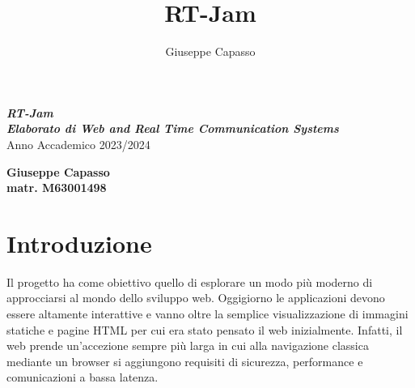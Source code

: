 \documentclass{article}
\title{RT-Jam}
\author{Giuseppe Capasso}
\begin{document}
\begin{titlepage}
  \thispagestyle{empty}
  \raggedright %


  \vfill

  {\textbf{\textit{\LARGE RT-Jam}}}
  \\[2cm]

  {\textbf{\textit{\Large Elaborato di Web and Real Time Communication Systems}}}
  \\[1cm]
  {\large Anno Accademico 2023/2024}

  \vfill

  \begin{table}[h]
    \textbf{Giuseppe Capasso}
    \\
    \textbf{matr. M63001498}
  \end{table}

\end{titlepage}

\tableofcontents
\newpage

\section*{Introduzione}
Il progetto ha come obiettivo quello di esplorare un modo più moderno di approcciarsi al 
mondo dello sviluppo web.  Oggigiorno le applicazioni devono essere altamente interattive e
vanno oltre la semplice visualizzazione di immagini statiche e pagine HTML per cui era stato
pensato il web inizialmente. Infatti, il web prende un'accezione sempre più larga
in cui alla navigazione classica mediante un browser si aggiungono requisiti di sicurezza,
performance e comunicazioni a bassa latenza. 
\end{document}
